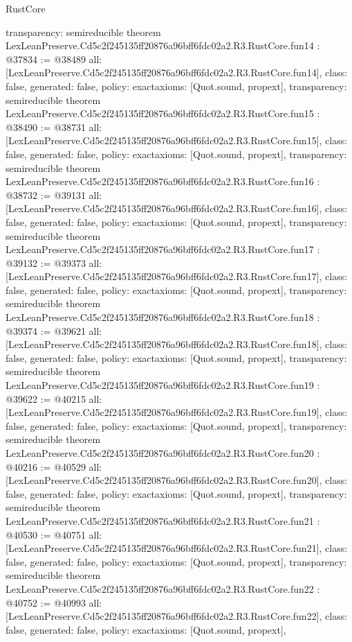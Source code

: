 \begin{lexlean}{RustCore}
\begin{coremodule}
{  transparency: semireducible
}
theorem LexLeanPreserve.Cd5c2f245135ff20876a96bff6fdc02a2.R3.RustCore.fun14 : @37834 := @38489 {
  all: [LexLeanPreserve.Cd5c2f245135ff20876a96bff6fdc02a2.R3.RustCore.fun14],
  class: false,
  generated: false,
  policy: exact{axioms: [Quot.sound, propext]},
  transparency: semireducible
}
theorem LexLeanPreserve.Cd5c2f245135ff20876a96bff6fdc02a2.R3.RustCore.fun15 : @38490 := @38731 {
  all: [LexLeanPreserve.Cd5c2f245135ff20876a96bff6fdc02a2.R3.RustCore.fun15],
  class: false,
  generated: false,
  policy: exact{axioms: [Quot.sound, propext]},
  transparency: semireducible
}
theorem LexLeanPreserve.Cd5c2f245135ff20876a96bff6fdc02a2.R3.RustCore.fun16 : @38732 := @39131 {
  all: [LexLeanPreserve.Cd5c2f245135ff20876a96bff6fdc02a2.R3.RustCore.fun16],
  class: false,
  generated: false,
  policy: exact{axioms: [Quot.sound, propext]},
  transparency: semireducible
}
theorem LexLeanPreserve.Cd5c2f245135ff20876a96bff6fdc02a2.R3.RustCore.fun17 : @39132 := @39373 {
  all: [LexLeanPreserve.Cd5c2f245135ff20876a96bff6fdc02a2.R3.RustCore.fun17],
  class: false,
  generated: false,
  policy: exact{axioms: [Quot.sound, propext]},
  transparency: semireducible
}
theorem LexLeanPreserve.Cd5c2f245135ff20876a96bff6fdc02a2.R3.RustCore.fun18 : @39374 := @39621 {
  all: [LexLeanPreserve.Cd5c2f245135ff20876a96bff6fdc02a2.R3.RustCore.fun18],
  class: false,
  generated: false,
  policy: exact{axioms: [Quot.sound, propext]},
  transparency: semireducible
}
theorem LexLeanPreserve.Cd5c2f245135ff20876a96bff6fdc02a2.R3.RustCore.fun19 : @39622 := @40215 {
  all: [LexLeanPreserve.Cd5c2f245135ff20876a96bff6fdc02a2.R3.RustCore.fun19],
  class: false,
  generated: false,
  policy: exact{axioms: [Quot.sound, propext]},
  transparency: semireducible
}
theorem LexLeanPreserve.Cd5c2f245135ff20876a96bff6fdc02a2.R3.RustCore.fun20 : @40216 := @40529 {
  all: [LexLeanPreserve.Cd5c2f245135ff20876a96bff6fdc02a2.R3.RustCore.fun20],
  class: false,
  generated: false,
  policy: exact{axioms: [Quot.sound, propext]},
  transparency: semireducible
}
theorem LexLeanPreserve.Cd5c2f245135ff20876a96bff6fdc02a2.R3.RustCore.fun21 : @40530 := @40751 {
  all: [LexLeanPreserve.Cd5c2f245135ff20876a96bff6fdc02a2.R3.RustCore.fun21],
  class: false,
  generated: false,
  policy: exact{axioms: [Quot.sound, propext]},
  transparency: semireducible
}
theorem LexLeanPreserve.Cd5c2f245135ff20876a96bff6fdc02a2.R3.RustCore.fun22 : @40752 := @40993 {
  all: [LexLeanPreserve.Cd5c2f245135ff20876a96bff6fdc02a2.R3.RustCore.fun22],
  class: false,
  generated: false,
  policy: exact{axioms: [Quot.sound, propext]},
}
\end{coremodule}
\end{lexlean}
